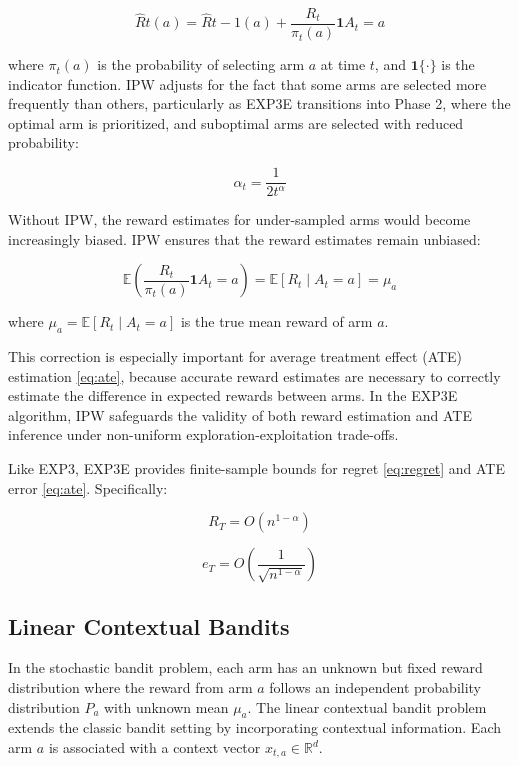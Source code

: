 \begin{equation}
\hat{R}t(a) = \hat{R}{t-1}(a) + \frac{R_t}{\pi_t(a)} \mathbf{1}{A_t = a}
\label{eq:ipw_update}
\end{equation}

where \( \pi_t(a) \) is the probability of selecting arm \( a \) at time \( t \), and \( \mathbf{1}\{\cdot\} \) is the indicator function. IPW adjusts for the fact that some arms are selected more frequently than others, particularly as EXP3E transitions into Phase 2, where the optimal arm is prioritized, and suboptimal arms are selected with reduced probability:

\begin{equation}
\alpha_t = \frac{1}{2t^\alpha}
\label{eq:alpha_decay}
\end{equation}

Without IPW, the reward estimates for under-sampled arms would become increasingly biased. IPW ensures that the reward estimates remain unbiased:

\begin{equation}
\mathbb{E}\left(\frac{R_t}{\pi_t(a)} \mathbf{1}{A_t = a}\right) = \mathbb{E}[R_t \mid A_t = a] = \mu_a
\label{eq:ipw_unbiased}
\end{equation}

where \(
\mu_a = \mathbb{E}[R_t \mid A_t = a]
\) is the true mean reward of arm \( a \). \citep{carranza2023ipw} 

This correction is especially important for average treatment effect (ATE) estimation \ref{eq:ate}, because accurate reward estimates are necessary to correctly estimate the difference in expected rewards between arms. In the EXP3E algorithm, IPW safeguards the validity of both reward estimation and ATE inference under non-uniform exploration-exploitation trade-offs.

Like EXP3, EXP3E provides finite-sample bounds for regret  \ref{eq:regret} and ATE error  \ref{eq:ate}. Specifically:

\begin{equation}
R_T = O(n^{1-\alpha})
\label{eq:exp3e_regret}
\end{equation}

\begin{equation}
e_T = O\left(\frac{1}{\sqrt{n^{1-\alpha}}}\right)
\label{eq:exp3e_ate_error}
\end{equation}

\subsection{Linear Contextual Bandits}\label{subsec:contextual}
In the stochastic bandit problem, each arm has an unknown but fixed reward distribution where the reward from arm $a$ follows an independent probability distribution $P_a$ with unknown mean $\mu_a$. The linear contextual bandit problem extends the classic bandit setting by incorporating contextual information. Each arm \(a\) is associated with a context vector \(x_{t,a} \in \mathbb{R^{\textit{d}}}\).

